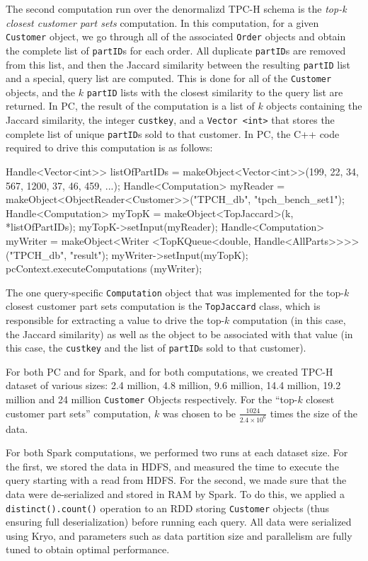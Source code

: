 The second computation run over the denormalizd TPC-H schema is the \emph{top-k closest customer part sets} computation.
In this computation, 
for a given
\texttt{Customer} object, we go through all of the associated 
\texttt{Order} objects and obtain the complete list of
\texttt{partID}s for each order.  All duplicate \texttt{partID}s are
removed from this list, and then the Jaccard similarity between the resulting \texttt{partID} list and a special, query
list are computed.  This is done for all of the \texttt{Customer} objects, and the $k$ \texttt{partID} lists with the 
closest similarity to the query list are returned.
In PC,
the result of the computation is a list of $k$ objects containing the Jaccard similarity, the integer \texttt{custkey}, and
a \texttt{Vector <int>} that stores the complete list of unique \texttt{partID}s sold to that customer.
In PC, the C++ code required to drive this computation is as follows:
\begin{code}
Handle<Vector<int>> listOfPartIDs = 
    makeObject<Vector<int>>(199, 22, 34, 567, 1200, 37, 46, 459, ...);
Handle<Computation> myReader = 
    makeObject<ObjectReader<Customer>>("TPCH_db", "tpch_bench_set1");
Handle<Computation> myTopK = makeObject<TopJaccard>(k, *listOfPartIDs);
myTopK->setInput(myReader);
Handle<Computation> myWriter = makeObject<Writer
    <TopKQueue<double, Handle<AllParts>>>>("TPCH_db", "result");
myWriter->setInput(myTopK);
pcContext.executeComputations (myWriter);
\end{code}

\noindent The one query-specific \texttt{Computation} object that was implemented for the top-$k$ 
closest customer part sets computation is the \texttt{TopJaccard} class, which
is responsible for extracting a value to drive the top-$k$ computation (in this case, the Jaccard similarity) as well
as the object to be associated with that value (in this case, the \texttt{custkey} and the list of 
\texttt{partID}s sold to that customer).

For both PC and for Spark, and for both computations, we created 
TPC-H dataset of various sizes: 2.4 million,
4.8 million, 9.6 million, 14.4 million, 19.2 million and 24 million
\texttt{Customer} Objects respectively.  For the ``top-$k$
closest customer part sets'' computation, $k$ was chosen to be $\frac{1024}{2.4 \times 10^6}$ times the size
of the data.

For both Spark computations, we performed two runs at each dataset size.
For the first, we stored the data in HDFS, and measured the time to execute the query starting with a
read from HDFS.
For the second, we made sure that the data were de-serialized and stored in RAM by Spark.
To do this, we applied a \texttt{distinct().count()} operation to
an RDD storing \texttt{Customer} objects (thus ensuring full deserialization) before running each query.
All data were
serialized using Kryo, and parameters such as data partition size and parallelism are fully tuned to obtain
optimal performance. 

